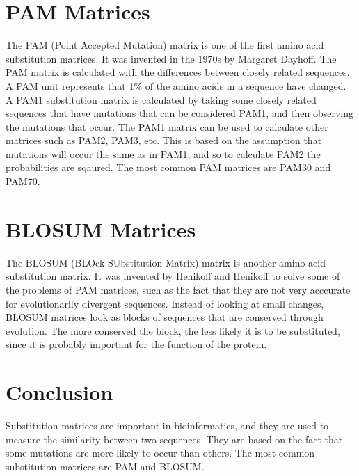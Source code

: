 \documentclass{article}
\begin{document}
\section{PAM Matrices}
The PAM (Point Accepted Mutation) matrix is one of the first amino acid substitution matrices. It was invented in the 1970s by Margaret Dayhoff. The PAM matrix is calculated with the differences between closely related sequences. A PAM unit represents that 1\% of the amino acids in a sequence have changed. A PAM1 substitution matrix is calculated by taking some closely related sequences that have mutations that can be considered PAM1, and then observing the mutations that occur. The PAM1 matrix can be used to calculate other matrices such as PAM2, PAM3, etc. This is based on the assumption that mutations will occur the same as in PAM1, and so to calculate PAM2 the probabilities are sqaured. The most common PAM matrices are PAM30 and PAM70.

\section{BLOSUM Matrices}
The BLOSUM (BLOck SUbstitution Matrix) matrix is another amino acid substitution matrix. It was invented by Henikoff and Henikoff to solve some of the problems of PAM matrices, such as the fact that they are not very acccurate for evolutionarily divergent sequences. Instead of looking at small changes, BLOSUM matrices look as blocks of sequences that are conserved through evolution. The more conserved the block, the less likely it is to be substituted, since it is probably important for the function of the protein.

\section{Conclusion}
Substitution matrices are important in bioinformatics, and they are used to measure the similarity between two sequences. They are based on the fact that some mutations are more likely to occur than others. The most common substitution matrices are PAM and BLOSUM.
\end{document}
